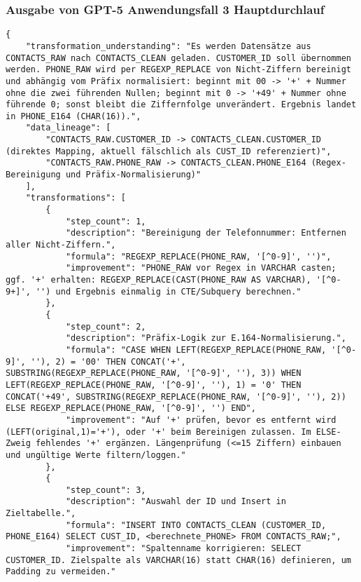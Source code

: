 \subsubsection{Ausgabe von GPT-5 Anwendungsfall 3 Hauptdurchlauf}\label{anhang:subsubsec:gpt_case3_prompt1}
\begin{lstlisting}[caption={Ausgabe: GPT-5 Anwendungsfall 3 Hauptdurchlauf},label={gpt_case3_prompt1}]
{
    "transformation_understanding": "Es werden Datensätze aus CONTACTS_RAW nach CONTACTS_CLEAN geladen. CUSTOMER_ID soll übernommen werden. PHONE_RAW wird per REGEXP_REPLACE von Nicht-Ziffern bereinigt und abhängig vom Präfix normalisiert: beginnt mit 00 -> '+' + Nummer ohne die zwei führenden Nullen; beginnt mit 0 -> '+49' + Nummer ohne führende 0; sonst bleibt die Ziffernfolge unverändert. Ergebnis landet in PHONE_E164 (CHAR(16)).",
    "data_lineage": [
        "CONTACTS_RAW.CUSTOMER_ID -> CONTACTS_CLEAN.CUSTOMER_ID (direktes Mapping, aktuell fälschlich als CUST_ID referenziert)",
        "CONTACTS_RAW.PHONE_RAW -> CONTACTS_CLEAN.PHONE_E164 (Regex-Bereinigung und Präfix-Normalisierung)"
    ],
    "transformations": [
        {
            "step_count": 1,
            "description": "Bereinigung der Telefonnummer: Entfernen aller Nicht-Ziffern.",
            "formula": "REGEXP_REPLACE(PHONE_RAW, '[^0-9]', '')",
            "improvement": "PHONE_RAW vor Regex in VARCHAR casten; ggf. '+' erhalten: REGEXP_REPLACE(CAST(PHONE_RAW AS VARCHAR), '[^0-9+]', '') und Ergebnis einmalig in CTE/Subquery berechnen."
        },
        {
            "step_count": 2,
            "description": "Präfix-Logik zur E.164-Normalisierung.",
            "formula": "CASE WHEN LEFT(REGEXP_REPLACE(PHONE_RAW, '[^0-9]', ''), 2) = '00' THEN CONCAT('+', SUBSTRING(REGEXP_REPLACE(PHONE_RAW, '[^0-9]', ''), 3)) WHEN LEFT(REGEXP_REPLACE(PHONE_RAW, '[^0-9]', ''), 1) = '0' THEN CONCAT('+49', SUBSTRING(REGEXP_REPLACE(PHONE_RAW, '[^0-9]', ''), 2)) ELSE REGEXP_REPLACE(PHONE_RAW, '[^0-9]', '') END",
            "improvement": "Auf '+' prüfen, bevor es entfernt wird (LEFT(original,1)='+'), oder '+' beim Bereinigen zulassen. Im ELSE-Zweig fehlendes '+' ergänzen. Längenprüfung (<=15 Ziffern) einbauen und ungültige Werte filtern/loggen."
        },
        {
            "step_count": 3,
            "description": "Auswahl der ID und Insert in Zieltabelle.",
            "formula": "INSERT INTO CONTACTS_CLEAN (CUSTOMER_ID, PHONE_E164) SELECT CUST_ID, <berechnete_PHONE> FROM CONTACTS_RAW;",
            "improvement": "Spaltenname korrigieren: SELECT CUSTOMER_ID. Zielspalte als VARCHAR(16) statt CHAR(16) definieren, um Padding zu vermeiden."

\end{lstlisting}
